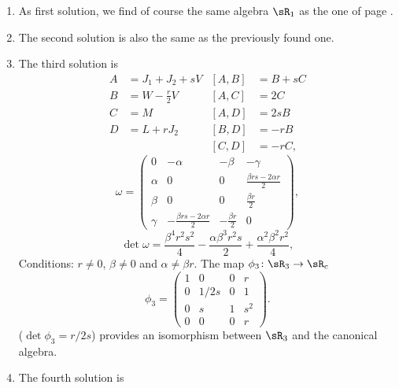 \let\ANCtheenumi\theenumi
\renewcommand{\theenumi}{\arabic{enumi}.}
\begin{enumerate}
	\item As first solution, we find of course the same algebra $\sR_1$ as the one of page \pageref{PgAlgUn}.
	\item The second solution is also the same as the previously found one.
	\item The third solution is
	      \begin{align*}
		      A & =J_{1}+J_{2}+sV   & [A,B] & =B+sC \\
		      B & =W-\frac{ r }{2}V & [A,C] & =2C   \\
		      C & =M                & [A,D] & =2sB  \\
		      D & =L+rJ_{2}         & [B,D] & =-rB  \\
		        &                   & [C,D] & =-rC,
	      \end{align*}
	      \begin{equation}
		      \omega=\begin{pmatrix}
			      0      & -\alpha                            & -\beta               & -\gamma                           \\
			      \alpha & 0                                  & 0                    & \frac{ \beta rs-2\alpha r  }{ 2 } \\
			      \beta  & 0                                  & 0                    & \frac{ \beta r }{2}               \\
			      \gamma & -\frac{ \beta rs-2\alpha r  }{ 2 } & -\frac{ \beta r }{2} & 0
		      \end{pmatrix},
	      \end{equation}
	      \[
		      \det\omega=\frac{ \beta^{4}r^{2}s^{2} }{ 4 }-\frac{ \alpha\beta^{3}r^{2}s }{ 2 }+\frac{ \alpha^{2}\beta^{2}r^{2} }{ 4 },
	      \]
	      Conditions: $r\neq 0$, $\beta\neq 0$ and $\alpha\neq\beta r$. The map $\phi_3\colon \sR_3\to \sR_c$
	      \[
		      \phi_3=
		      \begin{pmatrix}
			      1 & 0    & 0 & r   \\
			      0 & 1/2s & 0 & 1   \\
			      0 & s    & 1 & s^2 \\
			      0 & 0    & 0 & r
		      \end{pmatrix}.
	      \]
	      ($\det\phi_3=r/2s$) provides an isomorphism between $\sR_3$ and the canonical algebra.
	\item The fourth solution is

\end{enumerate}
